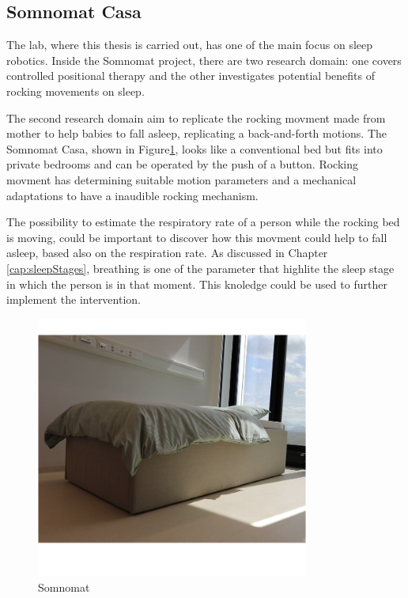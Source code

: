 \subsection{Somnomat Casa} \label{cap:Somnomat}
The lab, where this thesis is carried out, has one of the main focus on sleep robotics. Inside the Somnomat project, there are two research domain: one covers controlled positional therapy and the other investigates potential benefits of rocking movements on sleep.

The second research domain aim to replicate the rocking movment made from mother to help babies to fall asleep, replicating a back-and-forth motions. The Somnomat Casa, shown in Figure\ref{fig:somnomat}, looks like a conventional bed but fits into private bedrooms and can be operated by the push of a button. 
Rocking movment has determining suitable motion parameters and a mechanical adaptations to have a inaudible rocking mechanism.

The possibility to estimate the respiratory rate of a person while the rocking bed is moving, could be important to discover how this movment could help to fall asleep, based also on the respiration rate. As discussed in Chapter \ref{cap:sleepStages}, breathing is one of the parameter that highlite the sleep stage in which the person is in that moment. This knoledge could be used to further implement the intervention.


\begin{figure}[H]
    \centering
    \includegraphics[width=0.8\textwidth]{img/somnomat.png}
    \caption{Somnomat}
    \label{fig:somnomat}
\end{figure}



